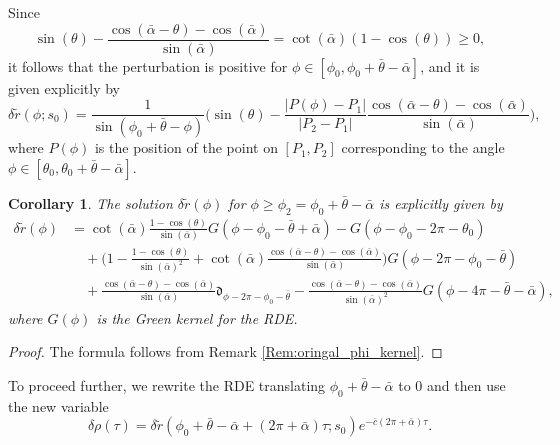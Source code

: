 \documentclass[reqno]{amsart}
\theoremstyle{definition} \newtheorem{definition}{Definition}[section]
\theoremstyle{definition} \newtheorem{remark}[definition]{Remark}
\theoremstyle{plain} \newtheorem{lemma}[definition]{Lemma}
\theoremstyle{plain} \newtheorem{proposition}[definition]{Proposition}
\theoremstyle{plain} \newtheorem{theorem}[definition]{Theorem}
\theoremstyle{plain} \newtheorem{corollary}[definition]{Corollary}
\theoremstyle{definition} \newtheorem{example}[definition]{Example}
\theoremstyle{plain} \newtheorem{claim}[clai]{Claim}
\theoremstyle{definition} \newtheorem{assumption}[definition]{Assumption}
\theoremstyle{definition} \newtheorem{observation}[definition]{Observation}
\newcommand{\1}{\mathbbm 1}
\newcommand{\Diracd}{\mathfrak{d}}
\numberwithin{equation}{section} %
\theoremstyle{plain} \newtheorem*{theorem*}{Theorem}
\theoremstyle{plain} \newtheorem{mthm}[maintheorem]{Main Theorem}
\theoremstyle{plain} \newtheorem*{mthm*}{Main Theorem}
\theoremstyle{plain} \newtheorem*{conjecture*}{Conjecture}
\theoremstyle{plain} \newtheorem{conjecture}[definition]{Conjecture}
\theoremstyle{plain} \newtheorem*{problem*}{Problem}
\begin{document}
Since
\begin{equation*}
\sin(\theta) - \frac{\cos(\bar \alpha - \theta) - \cos(\bar \alpha)}{\sin(\bar \alpha)} = \cot(\bar \alpha) (1 - \cos(\theta)) \geq 0,
\end{equation*}
it follows that the perturbation is positive for $\phi \in [\phi_0,\phi_0+\bar \theta - \bar \alpha]$, and it is given explicitly by
\begin{equation*}
\delta \tilde r(\phi;s_0) = \frac{1}{\sin(\phi_0 + \bar \theta - \phi)} \bigg( \sin(\theta) - \frac{|P(\phi) - P_1|}{|P_2 - P_1|} \frac{\cos(\bar \alpha - \theta) - \cos(\bar \alpha)}{\sin(\bar \alpha)} \bigg),
\end{equation*}
where $P(\phi)$ is the position of the point on $[P_1,P_2]$ corresponding to the angle $\phi \in [\theta_0,\theta_0 + \bar \theta - \bar \alpha]$.

\begin{corollary}
\label{Cor:evolv_r_after_phi_2}
The solution $\delta \tilde r(\phi)$ for $\phi \geq \phi_2 = \phi_0 + \bar \theta - \bar \alpha$ is explicitly given by
\begin{equation*}
\begin{split}
\delta \tilde r(\phi) &= \cot(\bar \alpha) \frac{1 - \cos(\theta)}{\sin(\bar \alpha)} G(\phi - \phi_0 - \bar \theta + \bar \alpha) - G(\phi - \phi_0 - 2\pi - \theta_0) \\
&\quad + \bigg( 1 - \frac{1 - \cos(\theta)}{\sin(\bar \alpha)^2} + \cot(\bar \alpha) \frac{\cos(\bar \alpha - \theta) - \cos(\bar \alpha)}{\sin(\bar \alpha)} \bigg) G(\phi - 2\pi - \phi_0 - \bar \theta) \\
& \quad + \frac{\cos(\bar \alpha - \theta) - \cos(\bar \alpha)}{\sin(\bar \alpha)} \Diracd_{\phi - 2\pi - \phi_0 - \bar \theta} - \frac{\cos(\bar \alpha - \theta) - \cos(\bar \alpha)}{\sin(\bar \alpha)^2} G(\phi - 4\pi - \bar \theta - \bar \alpha),
\end{split}
\end{equation*}
where $G(\phi)$ is the Green kernel for the RDE.
\end{corollary}

\begin{proof}
The formula follows from Remark \ref{Rem:oringal_phi_kernel}.
\end{proof}

To proceed further, we rewrite the RDE translating $\phi_0 + \bar \theta - \bar \alpha$ to $0$ and then use the new variable
\begin{equation}
\label{Equa:rho_segm_r}
\delta \rho(\tau) = \delta \tilde r(\phi_0 + \bar \theta - \bar \alpha + (2\pi + \bar \alpha) \tau;s_0) e^{- \bar c (2\pi + \bar \alpha) \tau}.
\end{equation}
\end{document}
